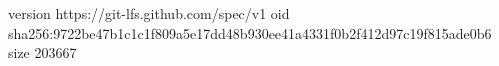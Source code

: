 version https://git-lfs.github.com/spec/v1
oid sha256:9722be47b1c1c1f809a5e17dd48b930ee41a4331f0b2f412d97c19f815ade0b6
size 203667
